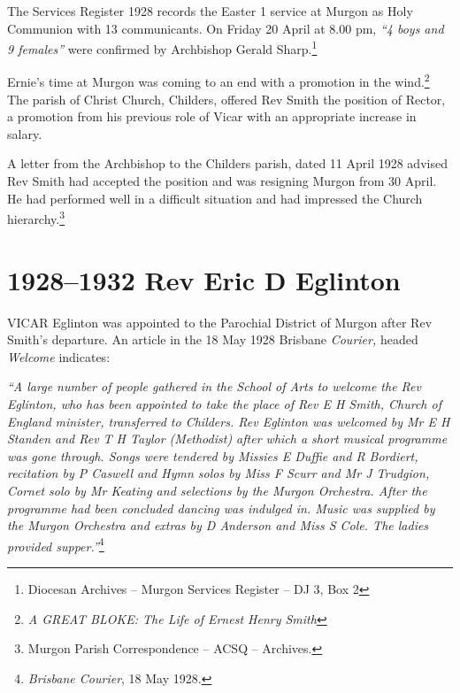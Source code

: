 The Services Register 1928 records the Easter 1 service at Murgon as Holy Communion with 13 communicants. On Friday 20 April at 8.00 pm, \emph{``4 boys and 9 females''} were confirmed by Archbishop Gerald Sharp.\footnote{Diocesan Archives -- Murgon Services Register -- DJ 3, Box 2}


Ernie's time at Murgon was coming to an end with a promotion in the wind.\footnote{\emph{A GREAT BLOKE: The Life of Ernest Henry Smith}} The parish of Christ Church, Childers, offered Rev Smith the position of Rector, a promotion from his previous role of Vicar with an appropriate increase in salary.


A letter from the Archbishop to the Childers parish, dated 11 April 1928 advised Rev Smith had accepted the position and was resigning Murgon from 30 April. He had performed well in a difficult situation and had impressed the Church hierarchy.\footnote{Murgon Parish Correspondence -- ACSQ -- Archives.}


\balance


\printendnotes[custom]
\setcounter{endnote}{0}
\chapter{1928--1932 Rev Eric D Eglinton}
\nobalance


\lettrine[lines=3]{V}{ICAR}
 Eglinton was appointed to the Parochial District of Murgon after Rev Smith's departure. An article in the 18 May 1928 Brisbane \emph{Courier,} headed \emph{Welcome} indicates:

\emph{``A large number of people gathered in the School of Arts to welcome the Rev Eglinton, who has been appointed to take the place of Rev E H Smith, Church of England minister, transferred to Childers. Rev Eglinton was welcomed by Mr E H Standen and Rev T H Taylor (Methodist) after which a short musical programme was gone through. Songs were tendered by Missies E Duffie and R Bordiert, recitation by P Caswell and Hymn solos by Miss F Scurr and Mr J Trudgion, Cornet solo by Mr Keating and selections by the Murgon Orchestra. After the programme had been concluded dancing was indulged in. Music was supplied by the Murgon Orchestra and extras by D Anderson and Miss S Cole. The ladies provided supper.''}\footnote{\emph{Brisbane Courier}, 18 May 1928.}


